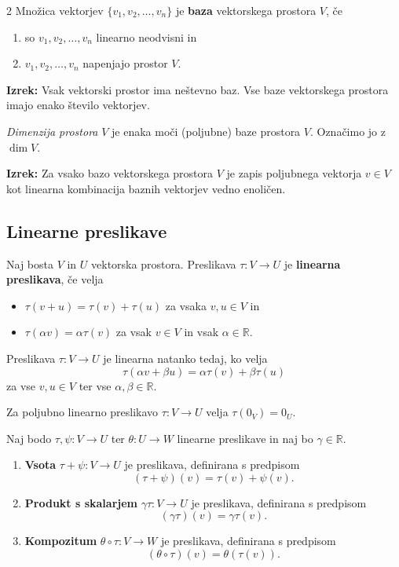 \documentclass{article}
\begin{document}
\begin{multicols}{2}
	Množica vektorjev \( \{v_1, v_2, \ldots, v_n\} \) je \textbf{baza} vektorskega prostora \( V \), če
	\begin{enumerate}
		\item[(B1)] so \( v_1, v_2, \ldots, v_n \) linearno neodvisni in
		\item[(B2)] \( v_1, v_2, \ldots, v_n \) napenjajo prostor \( V \).
	\end{enumerate}

	\textbf{Izrek:} Vsak vektorski prostor ima neštevno baz. Vse baze vektorskega prostora imajo enako število vektorjev.

	\emph{Dimenzija prostora} \( V \) je enaka moči (poljubne) baze prostora \( V \). Označimo jo z \(\dim V\).

	\textbf{Izrek:} Za vsako bazo vektorskega prostora \( V \) je zapis poljubnega vektorja \( v \in V \) kot linearna kombinacija baznih vektorjev vedno enoličen.


	\subsection{Linearne preslikave}
	Naj bosta \( V \) in \( U \) vektorska prostora. Preslikava \( \tau: V \to U \) je \textbf{linearna preslikava}, če velja
	\begin{itemize}
		\item[(1)] \( \tau(v + u) = \tau(v) + \tau(u) \) za vsaka \( v, u \in V \) in
		\item[(2)] \( \tau(\alpha v) = \alpha \tau(v) \) za vsak \( v \in V \) in vsak \( \alpha \in \mathbb{R} \).
	\end{itemize}

	Preslikava \( \tau: V \to U \) je linearna natanko tedaj, ko velja
	\[ \tau(\alpha v + \beta u) = \alpha \tau(v) + \beta \tau(u) \]
	za vse \( v, u \in V \) ter vse \( \alpha, \beta \in \mathbb{R} \).

	Za poljubno linearno preslikavo \( \tau: V \to U \) velja \( \tau(0_V) = 0_U \).

	Naj bodo \( \tau, \psi: V \to U \) ter \( \theta: U \to W \) linearne preslikave in naj bo \( \gamma \in \mathbb{R} \).
	\begin{enumerate}
		\item[(1)] \textbf{Vsota} \( \tau + \psi: V \to U \) je preslikava, definirana s predpisom
		      \[ (\tau + \psi)(v) = \tau(v) + \psi(v). \]
		\item[(2)] \textbf{Produkt s skalarjem} \( \gamma\tau: V \to U \) je preslikava, definirana s predpisom
		      \[ (\gamma\tau)(v) = \gamma \tau(v). \]
		\item[(3)] \textbf{Kompozitum} \( \theta \circ \tau: V \to W \) je preslikava, definirana s predpisom
		      \[ (\theta \circ \tau)(v) = \theta(\tau(v)). \]
	\end{enumerate}


\end{multicols}
\end{document}
